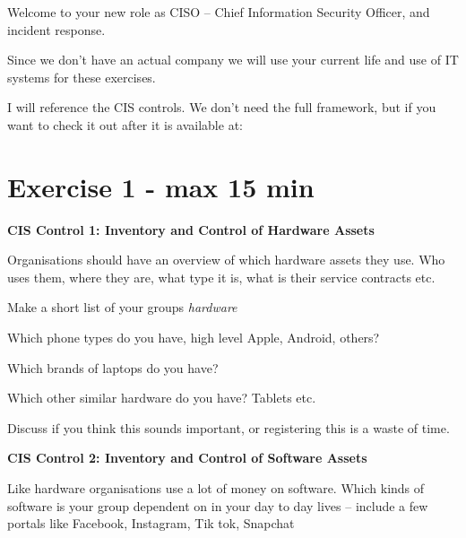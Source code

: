 \documentclass[a4paper,11pt,notitlepage,landscape]{report}
\begin{document}
\rm
{}

\newcommand{\subject}[1]{Introduction to Incident Response Elective, KEA}



\normal

Welcome to your new role as CISO -- Chief Information Security Officer, and incident response.

Since we don't have an actual company we will use your current life and use of IT systems for these exercises.

I will reference the CIS controls. We don't need the full framework, but if you want to check it out after it is available at: 



\eject
\section*{Exercise 1 - max 15 min}

{\bf CIS Control 1: Inventory and Control of Hardware Assets}

Organisations should have an overview of which hardware assets they use. Who uses them, where they are, what type it is, what is their service contracts etc.

Make a short list of your groups  \emph{hardware}

\begin{list1}
\item[\faSquareO] Which phone types do you have, high level Apple, Android, others?
\item[\faSquareO] Which brands of laptops do you have?
\item[\faSquareO] Which other similar hardware do you have? Tablets etc.
\end{list1}

Discuss if you think this sounds important, or registering this is a waste of time.


{\bf CIS Control 2: Inventory and Control of Software Assets}

Like hardware organisations use a lot of money on software. Which kinds of software is your group dependent on in your day to day lives -- include a few portals like Facebook, Instagram, Tik tok, Snapchat
\end{document}
